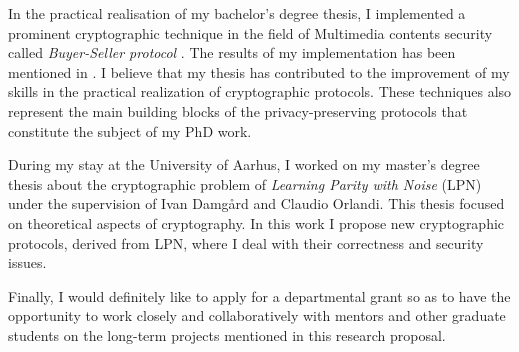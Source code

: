 \documentclass[dvips,12pt]{article}
\begin{document}
In the practical realisation of my bachelor's degree thesis, I implemented a prominent cryptographic technique in the field of Multimedia contents security called \emph{Buyer-Seller protocol} \cite{tesi}. 
The results of my implementation has been mentioned in \cite{tesi2}.
I believe that my thesis has contributed to the improvement of my skills in the practical realization of  cryptographic protocols. These techniques also represent the main building blocks of the privacy-preserving protocols that constitute the subject of my PhD work.

During my stay at the University of Aarhus, I worked on my master's degree thesis about the cryptographic problem of \emph{Learning Parity with Noise} (LPN) \cite{lpn} under the supervision of Ivan Damg{\aa}rd and Claudio Orlandi. 
This thesis focused on theoretical aspects of cryptography. In this work I propose new cryptographic protocols, derived from LPN, where I deal with their correctness and security issues.

Finally, I would definitely like to apply for a departmental grant so as to have the opportunity to work closely and collaboratively with mentors and other graduate students on the long-term projects mentioned in this research proposal.
\end{document}
